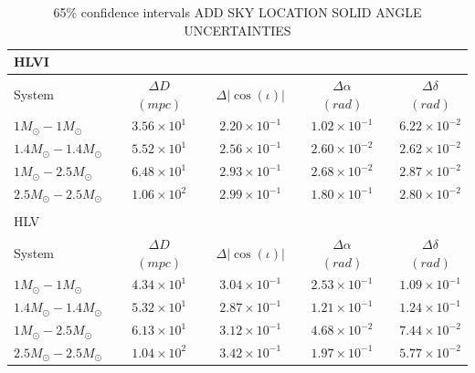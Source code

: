 \documentclass[11pt,a4paper]{emulateapj}
\newcommand{\carl}[1]{{\color{red}  #1}}
\begin{document}
 
\begin{table}[t!]
\centering
\caption{\carl{65\% confidence intervals ADD SKY LOCATION SOLID ANGLE UNCERTAINTIES}}
\begin{tabular}{lcccccccc}

\\HLVI\\
\hline\hline
 System & \vline & $\Delta D$ $(mpc)$ & \vline & $\Delta |\cos(\iota)|$ & \vline & $\Delta \alpha$ $(rad)$& \vline &  $\Delta \delta$   $(rad)$\\
\hline\hline
 $1M_{\odot}-1M_{\odot}$ & \vline & $3.56\times 10^{1}$ & \vline & $2.20\times 10^{-1}$ & \vline & $1.02\times 10^{-1}$ & \vline & $6.22\times 10^{-2}$ \\
\hline
 $1.4M_{\odot}-1.4M_{\odot}$ & \vline & $5.52\times 10^{1}$ & \vline & $2.56\times 10^{-1}$ & \vline & $2.60\times 10^{-2}$ & \vline & $2.62\times 10^{-2}$ \\
\hline
 $1M_{\odot}-2.5M_{\odot}$  & \vline & $6.48\times 10^{1}$ & \vline & $2.93\times 10^{-1}$ & \vline & $2.68\times 10^{-2}$ & \vline & $2.87\times 10^{-2}$ \\\hline
 $2.5M_{\odot}-2.5M_{\odot}$ & \vline & $1.06\times 10^{2}$ & \vline & $2.99\times 10^{-1}$ & \vline & $1.80\times 10^{-1}$ & \vline & $2.80\times 10^{-2}$ \\
\hline\hline

\\
HLV\\

\hline\hline
 System & \vline & $\Delta D$ $(mpc)$ & \vline & $\Delta |\cos(\iota)|$ & \vline & $\Delta \alpha$ $(rad)$& \vline &  $\Delta \delta$   $(rad)$\\
\hline\hline
 $1M_{\odot}-1M_{\odot}$ & \vline & $4.34\times 10^{1}$ & \vline & $3.04\times 10^{-1}$ & \vline & $2.53\times 10^{-1}$ & \vline & $1.09\times 10^{-1}$ \\
\hline
 $1.4M_{\odot}-1.4M_{\odot}$  & \vline & $5.32\times 10^{1}$ & \vline & $2.87\times 10^{-1}$ & \vline & $1.21\times 10^{-1}$ & \vline & $1.24\times 10^{-1}$ \\
\hline
  $1M_{\odot}-2.5M_{\odot}$& \vline & $6.13\times 10^{1}$ & \vline & $3.12\times 10^{-1}$ & \vline & $4.68\times 10^{-2}$ & \vline & $7.44\times 10^{-2}$ \\
\hline
 $2.5M_{\odot}-2.5M_{\odot}$ & \vline & $1.04\times 10^{2}$ & \vline & $3.42\times 10^{-1}$ & \vline & $1.97\times 10^{-1}$ & \vline & $5.77\times 10^{-2}$ \\
\hline\hline


\end{tabular}
\label{ciTableExtrinsic}
\end{table}
\end{document}
